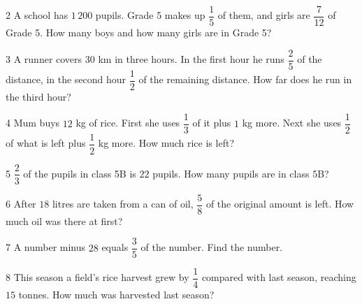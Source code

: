 \gap
\begin{probbox}{2}{\relax}
A school has $1\,200$ pupils. Grade 5 makes up $\dfrac15$ of them, and girls are $\dfrac7{12}$ of Grade 5. How many boys and how many girls are in Grade 5?
\end{probbox}
\gap
\begin{probbox}{3}{\relax}
A runner covers $30$ km in three hours. In the first hour he runs $\dfrac25$ of the distance, in the second hour $\dfrac12$ of the remaining distance. How far does he run in the third hour?
\end{probbox}
\gap
\begin{probbox}{4}{\relax}
Mum buys $12$ kg of rice. First she uses $\dfrac13$ of it plus $1$ kg more. Next she uses $\dfrac12$ of what is left plus $\dfrac12$ kg more. How much rice is left?
\end{probbox}
\gap
\begin{probbox}{5}{\relax}
$\dfrac23$ of the pupils in class 5B is $22$ pupils. How many pupils are in class 5B?
\end{probbox}
\gap
\begin{probbox}{6}{\relax}
After $18$ litres are taken from a can of oil, $\dfrac58$ of the original amount is left. How much oil was there at first?
\end{probbox}
\gap
\begin{probbox}{7}{\relax}
A number minus $28$ equals $\dfrac35$ of the number. Find the number.
\end{probbox}
\gap
\begin{probbox}{8}{\relax}
This season a field's rice harvest grew by $\dfrac14$ compared with last season, reaching $15$ tonnes. How much was harvested last season?
\end{probbox}
